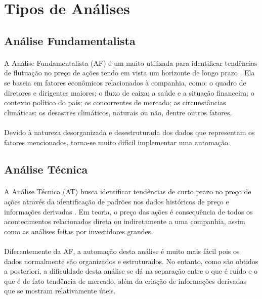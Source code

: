 \section{Tipos de Análises}

\subsection{Análise Fundamentalista}

\paragraph{} A Análise Fundamentalista (AF) é um muito utilizada para identificar tendências de flutuação no preço de ações tendo em vista um horizonte de longo prazo \cite{nti2020systematic}. Ela se baseia em fatores econômicos relacionados à companhia, como: o quadro de diretores e dirigentes maiores; o fluxo de caixa; a saúde e a situação financeira; o contexto político do país; os concorrentes de mercado; as circunstâncias climáticas; os desastres climáticos, naturais ou não, dentre outros fatores.

\paragraph{} Devido à natureza desorganizada e desestruturada dos dados que representam os fatores mencionados, torna-se muito difícil implementar uma automação.

\subsection{Análise Técnica}

\paragraph{} A Análise Técnica (AT) busca identificar tendências de curto prazo no preço de ações através da identificação de padrões nos dados históricos de preço e informações derivadas \cite{nti2020systematic}. Em teoria, o preço das ações é consequência de todos os acontecimentos relacionados direta ou indiretamente a uma companhia, assim como as análises feitas por investidores grandes.

\paragraph{} Diferentemente da AF, a automação desta análise é muito mais fácil pois os dados normalmente são organizados e estruturados. No entanto, como são obtidos a posteriori, a dificuldade desta análise se dá na separação entre o que é ruído e o que é de fato tendência de mercado, além da criação de informações derivadas que se mostram relativamente úteis.

